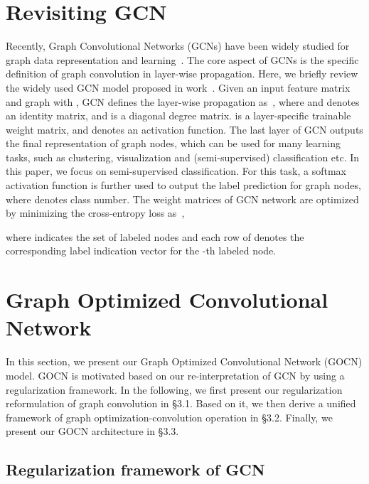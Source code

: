 \documentclass{article}
\begin{document}
\section{Revisiting GCN}
Recently, Graph Convolutional Networks (GCNs) have been widely studied for graph data representation and learning~\cite{defferrard2016convolutional,kipf2016semi,henaff2015deep,velickovic2017graph}.
The core aspect of GCNs is the specific definition of graph convolution in layer-wise propagation.
Here, we briefly review the widely used GCN model proposed in work~\cite{kipf2016semi}.
Given an input feature matrix  and graph  with , GCN defines the layer-wise propagation  as~\cite{kipf2016semi}, 
where  and  denotes an identity matrix, and  is a diagonal degree matrix.  is a layer-specific trainable weight matrix, and  denotes an activation function. 
The last layer of GCN outputs the final representation  of graph nodes, which can be used for many learning tasks, such as clustering, visualization and (semi-supervised) classification etc.
In this paper, we focus on semi-supervised classification.
For this task, a softmax activation function is further used to output the label prediction  for graph nodes, where  denotes class number. The weight matrices of GCN network  are optimized by minimizing the cross-entropy loss as~\cite{kipf2016semi},

where  indicates the set of labeled nodes and each row  of  denotes the corresponding label indication vector for the -th labeled node.



\section{Graph Optimized Convolutional Network}

In this section, we present our Graph Optimized Convolutional Network (GOCN) model.
GOCN is motivated based on our re-interpretation of GCN by using a regularization framework.
In the following, we first present our regularization reformulation of graph convolution in \S 3.1.
Based on it, we then derive a  unified framework of graph optimization-convolution operation in \S 3.2.
Finally, we present our GOCN architecture in \S 3.3.






\subsection{Regularization framework of GCN}
\end{document}
